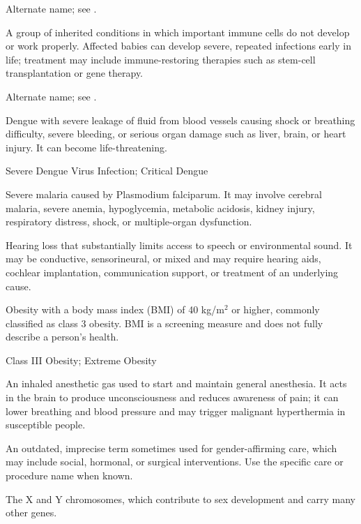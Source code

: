  Alternate name; see .

 A group of inherited conditions in which important immune cells do not develop or work properly. Affected babies can develop severe, repeated infections early in life; treatment may include immune-restoring therapies such as stem-cell transplantation or gene therapy.

 Alternate name; see .

 Dengue with severe leakage of fluid from blood vessels causing shock or breathing difficulty, severe bleeding, or serious organ damage such as liver, brain, or heart injury. It can become life-threatening.

\synonyms
Severe Dengue Virus Infection; Critical Dengue

 Severe malaria caused by Plasmodium falciparum. It may involve cerebral malaria, severe anemia, hypoglycemia, metabolic acidosis, kidney injury, respiratory distress, shock, or multiple-organ dysfunction.

 Hearing loss that substantially limits access to speech or environmental sound. It may be conductive, sensorineural, or mixed and may require hearing aids, cochlear implantation, communication support, or treatment of an underlying cause.

 Obesity with a body mass index (BMI) of 40 kg/m\(^2\) or higher, commonly classified as class 3 obesity. BMI is a screening measure and does not fully describe a person's health.

\synonyms
Class III Obesity; Extreme Obesity

 An inhaled anesthetic gas used to start and maintain general anesthesia. It acts in the brain to produce unconsciousness and reduces awareness of pain; it can lower breathing and blood pressure and may trigger malignant hyperthermia in susceptible people.

 An outdated, imprecise term sometimes used for gender-affirming care, which may include social, hormonal, or surgical interventions. Use the specific care or procedure name when known.

 The X and Y chromosomes, which contribute to sex development and carry many other genes.

